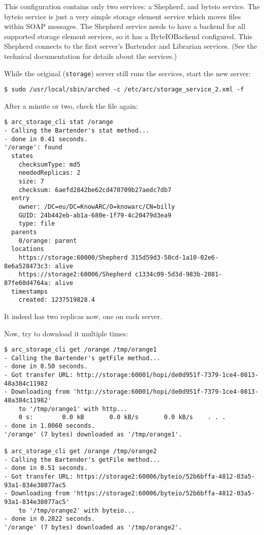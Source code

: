 \documentclass{article}
\begin{document}
This configuration contains only two services: a Shepherd, and byteio service. The byteio service is just a very simple storage element service which moves files within SOAP messages. The Shepherd service needs to have a backend for all supported storage element services, so it has a ByteIOBackend configured. This Shepherd connects to the first server's Bartender and Librarian services. (See the technical documentation for details about the services.)

While the original (\verb!storage!) server still runs the services, start the new server:

\begin{verbatim}
$ sudo /usr/local/sbin/arched -c /etc/arc/storage_service_2.xml -f
\end{verbatim}

After a minute or two, check the file again:

\begin{verbatim}
$ arc_storage_cli stat /orange
- Calling the Bartender's stat method...
- done in 0.41 seconds.
'/orange': found
  states
    checksumType: md5
    neededReplicas: 2
    size: 7
    checksum: 6aefd2842be62cd470709b27aedc7db7
  entry
    owner: /DC=eu/DC=KnowARC/O=knowarc/CN=billy
    GUID: 24b442eb-ab1a-680e-1f79-4c20479d3ea9
    type: file
  parents
    0/orange: parent
  locations
    https://storage:60000/Shepherd 315d59d3-50cd-1a10-02e6-8e6a528473c3: alive
    https://storage2:60006/Shepherd c1334c09-5d3d-983b-2081-87fe60d4764a: alive
  timestamps
    created: 1237519828.4
\end{verbatim}

It indeed has two replicas now, one on each server.

Now, try to download it multiple times:

\begin{verbatim}
$ arc_storage_cli get /orange /tmp/orange1
- Calling the Bartender's getFile method...
- done in 0.50 seconds.
- Got transfer URL: http://storage:60001/hopi/de0d951f-7379-1ce4-0813-48a384c11982
- Downloading from 'http://storage:60001/hopi/de0d951f-7379-1ce4-0813-48a384c11982'
    to '/tmp/orange1' with http...
    0 s:        0.0 kB       0.0 kB/s       0.0 kB/s    . . .       
- done in 1.0060 seconds.
'/orange' (7 bytes) downloaded as '/tmp/orange1'.
    
$ arc_storage_cli get /orange /tmp/orange2
- Calling the Bartender's getFile method...
- done in 0.51 seconds.
- Got transfer URL: https://storage2:60006/byteio/52b6bffa-4812-03a5-93a1-834e38077ac5
- Downloading from 'https://storage2:60006/byteio/52b6bffa-4812-03a5-93a1-834e38077ac5'
    to '/tmp/orange2' with byteio...
- done in 0.2822 seconds.
'/orange' (7 bytes) downloaded as '/tmp/orange2'.
\end{verbatim}
\end{document}
